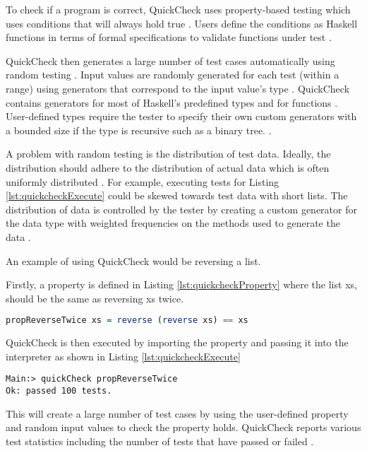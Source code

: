 To check if a program is correct, QuickCheck uses property-based testing which uses conditions that will always hold true \cite{QClightweight}.
Users define the conditions as Haskell functions in terms of formal specifications to validate functions under test \cite{QClightweight}. 

QuickCheck then generates a large number of test cases automatically using random testing \cite{QClightweight}. 
Input values are randomly generated for each test (within a range) using generators that correspond to the input value's type \cite{QClightweight}. 
QuickCheck contains generators for most of Haskell's predefined types and for functions \cite{QClightweight}. 
User-defined types require the tester to specify their own custom generators with a bounded size if the type is recursive such as a binary tree. \cite{QClightweight}. 

A problem with random testing is the distribution of test data. Ideally, the distribution should adhere to the distribution of actual data which is often uniformly distributed \cite{QClightweight}. 
For example, executing tests for Listing \ref{lst:quickcheckExecute} could be skewed towards test data with short lists. 
The distribution of data is controlled by the tester by creating a custom generator for the data type with weighted frequencies on the methods used to generate the data \cite{QClightweight}.

An example of using QuickCheck would be reversing a list.

Firstly, a property is defined in Listing \ref{lst:quickcheckProperty} where the list xs, should be the same as reversing xs twice.

\begin{lstlisting}[language=haskell, label={lst:quickcheckProperty},
caption={Property for reversing a list in QuickCheck}, captionpos=b, frame = single]
propReverseTwice xs = reverse (reverse xs) == xs
\end{lstlisting}

QuickCheck is then executed by importing the property and passing it into the interpreter as shown in Listing \ref{lst:quickcheckExecute}

\begin{lstlisting}[label={lst:quickcheckExecute}, caption={Executing tests to check a list is reversed}, captionpos=b,
frame = single]
Main:> quickCheck propReverseTwice
Ok: passed 100 tests.
\end{lstlisting}

This will create a large number of test cases by using the user-defined property and random input values to check the property holds. QuickCheck reports various test statistics including the number of tests that have passed or failed \cite{QClightweight}.

